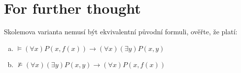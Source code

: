         
\section*{For further thought}

    
\begin{problem}
    
    Skolemova varianta nemusí být ekvivalentní původní formuli, ověřte, že platí:
    \begin{enumerate}[(a)]
        \item $\models (\forall x)P(x,f(x)) \to (\forall x)(\exists y)P(x,y)$
        \item $\not\models (\forall x)(\exists y)P(x,y)\to (\forall x)P(x,f(x))$
    \end{enumerate}

\end{problem}















 


